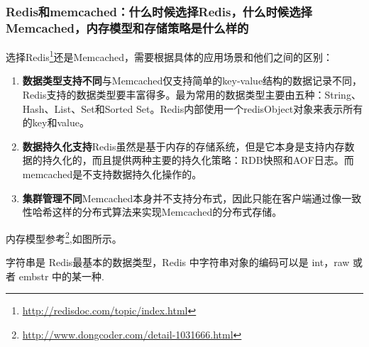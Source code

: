 \documentclass[../../../interview-questions.tex]{subfiles}
\begin{document}
\subsubsection{Redis和memcached：什么时候选择Redis，什么时候选择Memcached，内存模型和存储策略是什么样的}


选择Redis\footnote{\url{http://redisdoc.com/topic/index.html}}还是Memcached，需要根据具体的应用场景和他们之间的区别：

\begin{enumerate}
\item {\textbf{数据类型支持不同}}与Memcached仅支持简单的key-value结构的数据记录不同，Redis支持的数据类型要丰富得多。最为常用的数据类型主要由五种：String、Hash、List、Set和Sorted Set。Redis内部使用一个redisObject对象来表示所有的key和value。
\item {\textbf{数据持久化支持}}Redis虽然是基于内存的存储系统，但是它本身是支持内存数据的持久化的，而且提供两种主要的持久化策略：RDB快照和AOF日志。而memcached是不支持数据持久化操作的。
\item {\textbf{集群管理不同}}Memcached本身并不支持分布式，因此只能在客户端通过像一致性哈希这样的分布式算法来实现Memcached的分布式存储。
\end{enumerate}                                  

内存模型参考\footnote{\url{http://www.dongcoder.com/detail-1031666.html}},如图所示。



字符串是 Redis最基本的数据类型，Redis 中字符串对象的编码可以是 int，raw 或者 embstr 中的某一种.
\end{document}
